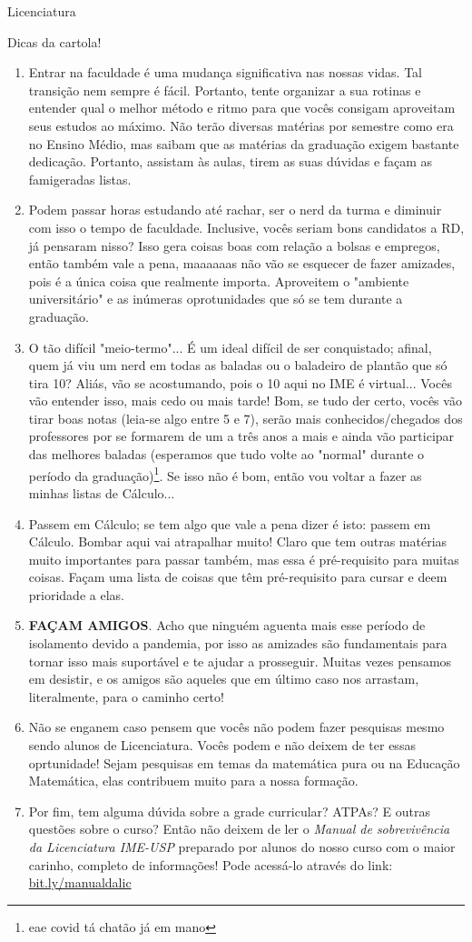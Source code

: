 \begin{subsecao}{Licenciatura}
\begin{subsubsecao}{Dicas da cartola!}
\begin{enumerate}
\item Entrar na faculdade é uma mudança significativa nas nossas vidas. Tal transição
nem sempre é fácil. Portanto, tente organizar a sua rotinas e entender qual o melhor
método e ritmo para que vocês consigam aproveitam seus estudos ao máximo. Não terão diversas
matérias por semestre como era no Ensino Médio, mas saibam que as matérias da graduação exigem
 bastante dedicação. Portanto, assistam às aulas, tirem as suas dúvidas e façam as famigeradas listas. 
\item Podem passar horas estudando até rachar, ser o nerd da turma e diminuir com
 isso o tempo de faculdade. Inclusive, vocês seriam bons candidatos a RD, já pensaram nisso? 
Isso gera coisas boas com relação a bolsas e empregos, então também vale a pena, 
maaaaaas não vão se esquecer de fazer amizades, pois é a única coisa que realmente importa.
Aproveitem o "ambiente universitário" e as inúmeras oprotunidades que só se tem durante
a graduação.
\item O tão difícil "meio-termo"... É um ideal difícil de ser conquistado; afinal,
  quem já viu um nerd em todas as baladas ou o baladeiro de plantão que só tira
  10? Aliás, vão se acostumando, pois o 10 aqui no IME é virtual... Vocês vão
  entender isso, mais cedo ou mais tarde! Bom, se tudo der certo, vocês vão
  tirar boas notas (leia-se algo entre 5 e 7), serão mais conhecidos/chegados
  dos professores por se formarem de um a três anos a mais e ainda
  vão participar das melhores baladas (esperamos que tudo volte ao "normal" durante
  o período da graduação)\footnote{eae covid tá chatão já em mano}.  %
  Se isso não é bom, então vou voltar a fazer as minhas listas de Cálculo...
\item Passem em Cálculo; se tem algo que vale a pena dizer é isto: passem em
  Cálculo. Bombar aqui vai atrapalhar muito! Claro que tem outras matérias muito
  importantes para passar também, mas essa é pré-requisito para muitas coisas.
  Façam uma lista de coisas que têm pré-requisito para cursar e deem prioridade
  a elas. 
  \item \textbf{FAÇAM AMIGOS}. Acho que ninguém aguenta mais esse período de isolamento
devido a pandemia, por isso as amizades são fundamentais para tornar isso
mais suportável e te ajudar a prosseguir. Muitas vezes pensamos em desistir,
 e os amigos são aqueles que em último caso nos arrastam, literalmente, para o caminho certo!  %
 \item Não se enganem caso pensem que vocês não podem fazer pesquisas mesmo sendo alunos de
 Licenciatura. Vocês podem e não deixem de ter essas oprtunidade! Sejam pesquisas em temas
 da matemática pura ou na Educação Matemática, elas contribuem muito para a nossa formação.
 \item Por fim, tem alguma dúvida sobre a grade curricular? ATPAs? E outras questões sobre o curso?
Então não deixem de ler o \textit{Manual de sobrevivência da Licenciatura IME-USP} preparado por alunos
do nosso curso com o maior carinho, completo de informações! Pode acessá-lo através
do link: \url{bit.ly/manualdalic}


\end{enumerate}
\end{subsubsecao}
\end{subsecao}
